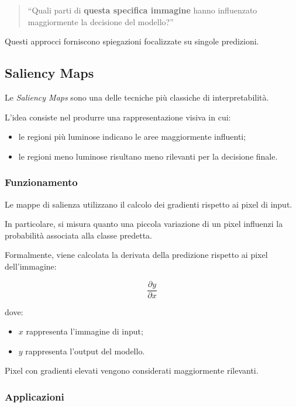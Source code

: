 \begin{quote}
``Quali parti di \textbf{questa specifica immagine} hanno influenzato maggiormente la decisione del modello?''
\end{quote}

Questi approcci forniscono spiegazioni focalizzate su singole predizioni.

\subsection{Saliency Maps}

Le \textit{Saliency Maps} sono una delle tecniche più classiche di interpretabilità.

L'idea consiste nel produrre una rappresentazione visiva in cui:

\begin{itemize}
    \item le regioni più luminose indicano le aree maggiormente influenti;
    \item le regioni meno luminose risultano meno rilevanti per la decisione finale.
\end{itemize}

\subsubsection{Funzionamento}

Le mappe di salienza utilizzano il calcolo dei gradienti rispetto ai pixel di input.

In particolare, si misura quanto una piccola variazione di un pixel influenzi la probabilità associata alla classe predetta.

Formalmente, viene calcolata la derivata della predizione rispetto ai pixel dell'immagine:

\[
\frac{\partial y}{\partial x}
\]

dove:

\begin{itemize}
    \item $x$ rappresenta l'immagine di input;
    \item $y$ rappresenta l'output del modello.
\end{itemize}

Pixel con gradienti elevati vengono considerati maggiormente rilevanti.

\subsubsection{Applicazioni}

